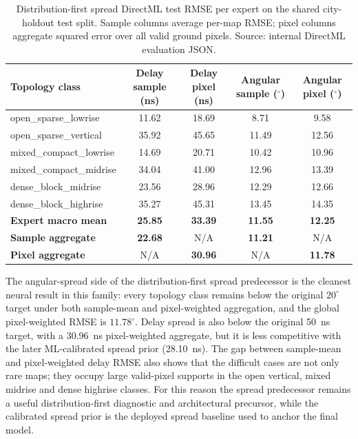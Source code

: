 \begin{table}[H]
\centering
\caption[Distribution-first spread RMSE per expert.]%
{Distribution-first spread DirectML test RMSE per expert on the shared
city-holdout test split. Sample columns average per-map RMSE; pixel
columns aggregate squared error over all valid ground pixels. Source:
internal DirectML evaluation JSON.}
\label{tab:try77_per_expert}
\scriptsize
\begin{tabular}{lcccc}
\toprule
Topology class & Delay sample (ns) & Delay pixel (ns) & Angular sample ($^\circ$) & Angular pixel ($^\circ$) \\
\midrule
open\_sparse\_lowrise   & 11.62 & 18.69 &  8.71 &  9.58 \\
open\_sparse\_vertical  & 35.92 & 45.65 & 11.49 & 12.56 \\
mixed\_compact\_lowrise & 14.69 & 20.71 & 10.42 & 10.96 \\
mixed\_compact\_midrise & 34.04 & 41.00 & 12.96 & 13.39 \\
dense\_block\_midrise   & 23.56 & 28.96 & 12.29 & 12.66 \\
dense\_block\_highrise  & 35.27 & 45.31 & 13.45 & 14.35 \\
\midrule
\textbf{Expert macro mean} & \textbf{25.85} & \textbf{33.39} & \textbf{11.55} & \textbf{12.25} \\
\textbf{Sample aggregate}  & \textbf{22.68} & N/A & \textbf{11.21} & N/A \\
\textbf{Pixel aggregate}   & N/A & \textbf{30.96} & N/A & \textbf{11.78} \\
\bottomrule
\end{tabular}
\end{table}

The angular-spread side of the distribution-first spread predecessor is the cleanest neural result in this
family: every topology class remains below the original \(20^\circ\)
target under both sample-mean and pixel-weighted aggregation, and the
global pixel-weighted RMSE is \(11.78^\circ\). Delay spread is also
below the original \SI{50}{ns} target, with a \SI{30.96}{ns}
pixel-weighted aggregate, but it is less competitive with the later
ML-calibrated spread prior (\SI{28.10}{ns}). The gap between sample-mean and
pixel-weighted delay RMSE also shows that the difficult cases are not
only rare maps; they occupy large valid-pixel supports in the open
vertical, mixed midrise and dense highrise classes. For this reason the spread
predecessor remains a useful distribution-first diagnostic and architectural
precursor, while the calibrated spread prior is the deployed spread baseline used to anchor
the final model.

